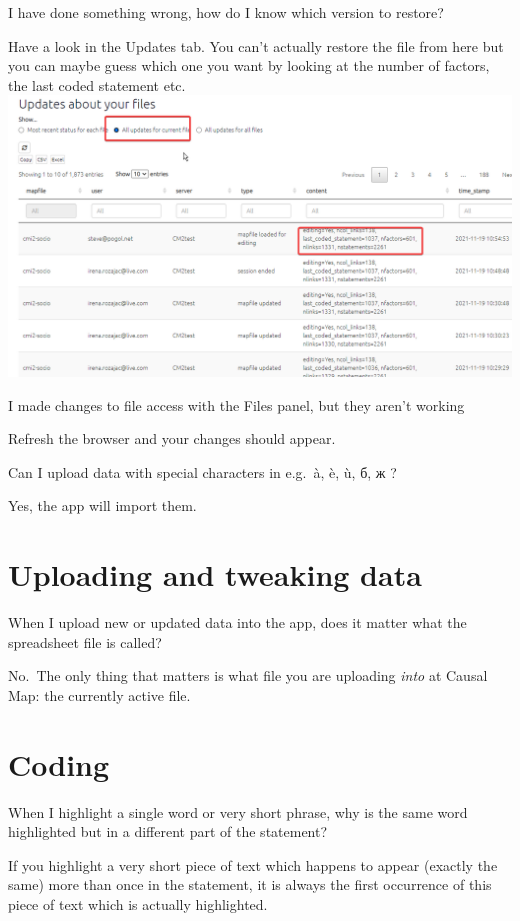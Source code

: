 \documentclass[
]{book}
\begin{document}
I have done something wrong, how do I know which version to restore?

Have a look in the Updates tab. You can't actually restore the file from here but you can maybe guess which one you want by looking at the number of factors, the last coded statement etc.
\includegraphics{_assets/image-20211119105900995.png}

I made changes to file access with the Files panel, but they aren't working

Refresh the browser and your changes should appear.

Can I upload data with special characters in e.g.~à, è, ù, б, ж ?

Yes, the app will import them.

\hypertarget{uploading-and-tweaking-data}{%
\section{Uploading and tweaking data}\label{uploading-and-tweaking-data}}

When I upload new or updated data into the app, does it matter what the spreadsheet file is called?

No.~The only thing that matters is what file you are uploading \emph{into} at Causal Map: the currently active file.

\hypertarget{coding}{%
\section{Coding}\label{coding}}

When I highlight a single word or very short phrase, why is the same word highlighted but in a different part of the statement?

If you highlight a very short piece of text which happens to appear (exactly the same) more than once in the statement, it is always the first occurrence of this piece of text which is actually highlighted.
\end{document}
